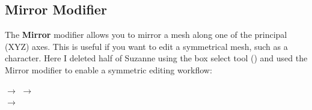 \documentclass[11pt]{article}
\begin{document}
\subsection{Mirror Modifier}
The \textbf{Mirror} modifier allows you to mirror a mesh along one of the principal (XYZ) axes.
This is useful if you want to edit a symmetrical mesh, such as a character.  Here I deleted half
of Suzanne using the box select tool () and used the Mirror modifier to enable a symmetric
editing workflow:
\begin{center}
     $\rightarrow$ 
     $\rightarrow$ \\
     $\rightarrow$ 
\end{center}
\end{document}
